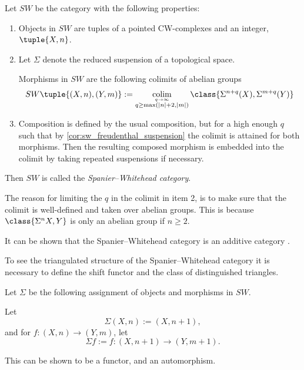 \begin{definition}
    \label{def:sw-cat}
    Let \( SW \) be the category with the following properties:
    \begin{enumerate}
        \item {
            Objects in \( SW \) are tuples of a pointed CW-complexes and an integer, \( \tuple{X, n} \).
        }
        \item {
            Let \( \Sigma \) denote the reduced suspension of a topological space.

            Morphisms in \( SW \) are the following colimits of abelian groups
            \[
                SW\tuple{ (X, n), (Y, m) } := \colim_{\stackrel{q \to \infty}{q \geq \max(|n| + 2, |m|)}} \class{ \Sigma^{n + q}(X), \Sigma^{m + q}(Y) }
            \]
        }
        \item {
            Composition is defined by the usual composition, but for a high enough \( q \) such that by \autoref{cor:sw_freudenthal_suspension} the colimit is attained for both morphisms. Then the resulting composed morphism is embedded into the colimit by taking repeated suspensions if necessary.
        }
    \end{enumerate}

    Then \( SW \) is called the \emph{Spanier--Whitehead category}.
\end{definition}

The reason for limiting the \( q \) in the colimit in item 2, is to make sure that the colimit is well-defined and taken over abelian groups. This is because \( \class{\Sigma^n X, Y} \) is only an abelian group if \( n \geq 2 \).

It can be shown that the Spanier--Whitehead category is an additive category \cite[Proposition 5.7]{Daria_Bachelor}.

To see the triangulated structure of the Spanier--Whitehead category it is necessary to define the shift functor and the class of distinguished triangles.

\begin{definition}
    \label{def:sw-shift}
    Let \( \Sigma \) be the following assignment of objects and morphisms in \( SW \).

    Let
    \[
        \Sigma(X, n) := (X, n + 1),
    \] 
    and for \( f: (X, n) \to (Y, m) \), let
    \[
        \Sigma f := f: (X, n + 1) \to (Y, m + 1).
    \]

    This can be shown to be a functor, and an automorphism.
\end{definition}


